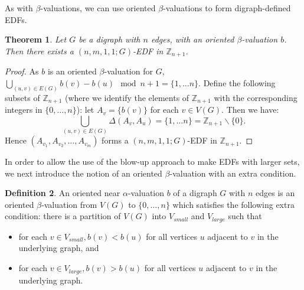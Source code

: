\documentclass[12pt, a4paper]{article}
\newtheorem{theorem}{Theorem}[section]
\theoremstyle{definition}
\newtheorem{definition}[theorem]{Definition}
\begin{document}
As with $\beta$-valuations, we can use oriented $\beta$-valuations to form digraph-defined EDFs.

\begin{theorem}\label{orbetaEDF}
Let $G$ be a digraph with $n$ edges, with an oriented $\beta$-valuation $b$. Then there exists a $(n,m,1,1;G)$-EDF in $\mathbb{Z}_{n+1}$.
\end{theorem}
\begin{proof}
As $b$ is an oriented $\beta$-valuation for $G$, $\bigcup_{(u,v)\in E(G)} b(v)-b(u) \mod n+1 = \{1, \ldots n\}$.
Define the following subsets of $\mathbb{Z}_{n+1}$ (where we identify the elements of $\mathbb{Z}_{n+1}$ with the corresponding integers in $\{0,\ldots,n\}$): let $A_v=\{b(v)\}$ for each $v \in V(G)$. Then we have:
\[\bigcup_{(u,v)\in E(G)} \Delta(A_v,A_u)= \{1, \ldots n\}=\mathbb{Z}_{n+1}\backslash\{0\}.\]
Hence $(A_{v_1},A_{v_2},\ldots,A_{v_{m}})$ forms a $(n,m,1,1;G)$-EDF in $\mathbb{Z}_{n+1}$.
\end{proof}

In order to allow the use of the blow-up approach to make EDFs with larger sets, we next introduce the notion of an oriented $\beta$-valuation with an extra condition.

\begin{definition}An oriented near $\alpha$-valuation $b$ of a digraph $G$ with $n$ edges is an oriented $\beta$‐valuation from $V(G)$ to $\{0,\ldots,n\}$ which satisfies the following extra condition: there is a partition of $V(G)$ into $V_{small}$ and $V_{large}$ such that
\begin{itemize}
\item for each $v \in V_{small}, b(v) < b(u)$ for all vertices $u$ adjacent to $v$ in the underlying graph, and 
\item for each $v \in V_{large}, b(v) > b(u)$ for all vertices $u$ adjacent to $v$ in the underlying graph.
\end{itemize}
\end{definition}
\end{document}
